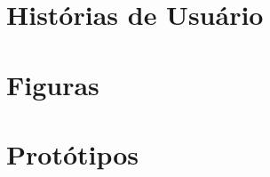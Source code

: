 \begin{apendicesenv}
    \partapendices

    \chapter{Histórias de Usuário}
    \label{ch:historias_de_usuario}
    

    \chapter{Figuras}
    \label{ch:figuras}
    

    \chapter{Protótipos}
    \label{ch:prototipos}
    
    
\end{apendicesenv}